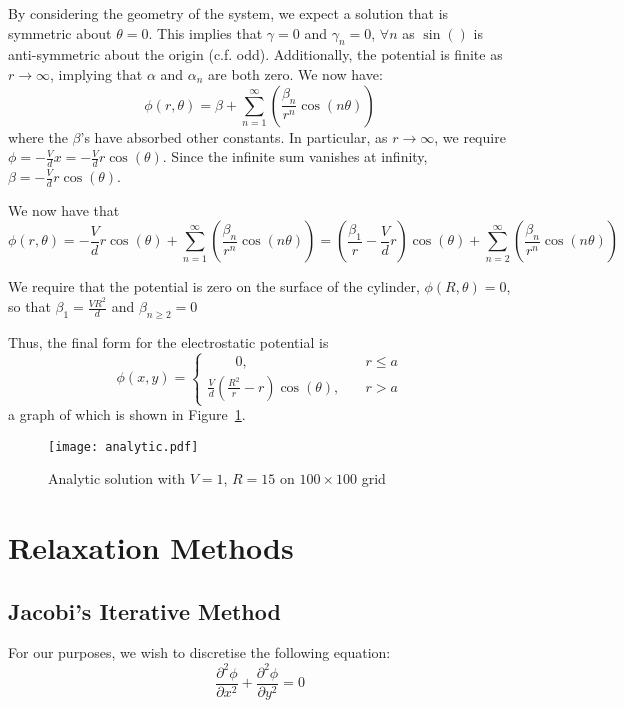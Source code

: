 \documentclass[12pt, a4paper]{article}
\newcommand{\be}{\begin{equation}}
\newcommand{\ee}{\end{equation}}
\begin{document}
By considering the geometry of the system, we expect a solution that is symmetric
about $\theta=0$. This implies that $\gamma = 0$ and $\gamma_n=0$, $\forall n$ as
$\sin()$ is anti-symmetric about the origin (c.f. odd). Additionally, the potential
is finite as $r \rightarrow \infty$, implying that $\alpha$ and $\alpha_n$ are both
zero. We now have:
%
\be
\phi(r,\theta)=\beta + \sum_{n=1}^{\infty}(\frac{\beta_n}{r^n} \cos(n\theta))
\ee
%
where the $\beta$'s have absorbed other constants. In particular, as
$r \rightarrow \infty$, we require $\phi=-\frac{V}{d}x=-\frac{V}{d}r\cos(\theta)$.
Since the infinite sum vanishes at infinity, $\beta=-\frac{V}{d}r\cos(\theta)$.

We now have that
%
\be
\phi(r,\theta)=-\frac{V}{d}r\cos(\theta) + \sum_{n=1}^{\infty}(\frac{\beta_n}{r^n} \cos(n\theta))
              =(\frac{\beta_1}{r}-\frac{V}{d}r)\cos(\theta) + \sum_{n=2}^{\infty}(\frac{\beta_n}{r^n} \cos(n\theta))
\ee

We require that the potential is zero on the surface of the cylinder,
$\phi(R,\theta)=0$, so that $\beta_1=\frac{VR^2}{d}$ and $\beta_{n \geq 2}=0$

Thus, the final form for the electrostatic potential is
%
\be
\phi(x,y)=
\begin{cases} \qquad 0, & \quad r \leq a \\
\frac{V}{d}(\frac{R^2}{r}-r)\cos(\theta), & \quad r > a
\end{cases}
\ee
%
a graph of which is shown in Figure~\ref{fig:analytic}.

\begin{figure}
\begin{center}
\texttt{[image: analytic.pdf]}
\caption{Analytic solution with $V=1$, $R=15$ on $100\times100$ grid}
\label{fig:analytic}
\end{center}
\end{figure}

\section{Relaxation Methods}

\subsection{Jacobi's Iterative Method}

For our purposes, we wish to discretise the following equation:
% 
\be 
\frac{\partial^2 \phi}{\partial x^2}+\frac{\partial^2 \phi}{\partial y^2} = 0
\label{eq:laplace}
\ee 
\end{document}
